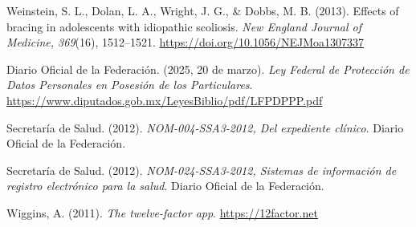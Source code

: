 \documentclass[12pt,a4paper]{article}
\begin{document}
\begin{description}[leftmargin=0.5in, labelindent=0in, itemsep=6pt, style=nextline, font=\normalfont]
\item[] Weinstein, S. L., Dolan, L. A., Wright, J. G., \& Dobbs, M. B. (2013). Effects of bracing in adolescents with idiopathic scoliosis. \emph{New England Journal of Medicine, 369}(16), 1512--1521. \url{https://doi.org/10.1056/NEJMoa1307337}
\item[] Diario Oficial de la Federaci\'on. (2025, 20 de marzo). \emph{Ley Federal de Protecci\'on de Datos Personales en Posesi\'on de los Particulares}. \url{https://www.diputados.gob.mx/LeyesBiblio/pdf/LFPDPPP.pdf}
\item[] Secretar\'ia de Salud. (2012). \emph{NOM-004-SSA3-2012, Del expediente cl\'inico}. Diario Oficial de la Federaci\'on.
\item[] Secretar\'ia de Salud. (2012). \emph{NOM-024-SSA3-2012, Sistemas de informaci\'on de registro electr\'onico para la salud}. Diario Oficial de la Federaci\'on.
\item[] Wiggins, A. (2011). \emph{The twelve-factor app}. \url{https://12factor.net}
\end{description}
\end{document}
